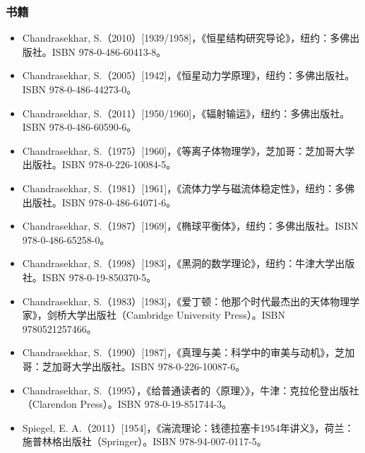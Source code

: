 \subsubsection{书籍}
\begin{itemize}
\item Chandrasekhar, S.（2010）[1939/1958]，《恒星结构研究导论》，纽约：多佛出版社。ISBN 978-0-486-60413-8。
\item Chandrasekhar, S.（2005）[1942]，《恒星动力学原理》，纽约：多佛出版社。ISBN 978-0-486-44273-0。
\item Chandrasekhar, S.（2011）[1950/1960]，《辐射输运》，纽约：多佛出版社。ISBN 978-0-486-60590-6。
\item Chandrasekhar, S.（1975）[1960]，《等离子体物理学》，芝加哥：芝加哥大学出版社。ISBN 978-0-226-10084-5。
\item Chandrasekhar, S.（1981）[1961]，《流体力学与磁流体稳定性》，纽约：多佛出版社。ISBN 978-0-486-64071-6。
\item Chandrasekhar, S.（1987）[1969]，《椭球平衡体》，纽约：多佛出版社。ISBN 978-0-486-65258-0。
\item Chandrasekhar, S.（1998）[1983]，《黑洞的数学理论》，纽约：牛津大学出版社。ISBN 978-0-19-850370-5。
\item Chandrasekhar, S.（1983）[1983]，《爱丁顿：他那个时代最杰出的天体物理学家》，剑桥大学出版社（Cambridge University Press）。ISBN 9780521257466。
\item Chandrasekhar, S.（1990）[1987]，《真理与美：科学中的审美与动机》，芝加哥：芝加哥大学出版社。ISBN 978-0-226-10087-6。
\item Chandrasekhar, S.（1995），《给普通读者的〈原理〉》，牛津：克拉伦登出版社（Clarendon Press）。ISBN 978-0-19-851744-3。
\item Spiegel, E. A.（2011）[1954]，《湍流理论：钱德拉塞卡1954年讲义》，荷兰：施普林格出版社（Springer）。ISBN 978-94-007-0117-5。
\end{itemize}
